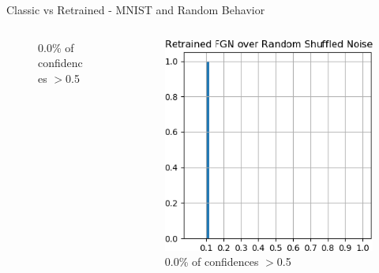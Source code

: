 \documentclass{beamer}
\begin{document}
\begin{frame}{Classic vs Retrained - MNIST and Random Behavior}
\begin{columns}
\begin{column}{.33\textwidth}
\begin{figure}
        \centering \tiny{0.0\% of confidences $>$0.5}
    \end{figure}
    \end{column}
    \begin{column}{.33\textwidth}
    \begin{figure}
        \centering
        \includegraphics[width=.9\textwidth]{images/mnist-behavior/retrained-hist-shuffled.png}
        \centering \tiny{0.0\% of confidences $>$0.5}
    \end{figure}
    \end{column}
    \end{columns}
    
\end{frame}
\end{document}
